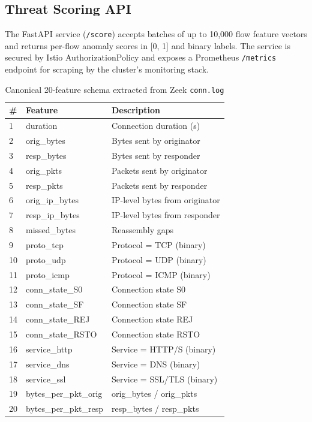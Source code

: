 \subsection{Threat Scoring API}
The FastAPI service (\texttt{/score}) accepts batches of up to 10,000
flow feature vectors and returns per-flow anomaly scores in [0, 1] and
binary labels.
The service is secured by Istio AuthorizationPolicy and exposes a
Prometheus \texttt{/metrics} endpoint for scraping by the cluster's
monitoring stack.

\begin{table}[htbp]
  \centering
  \caption{Canonical 20-feature schema extracted from Zeek \texttt{conn.log}}
  \label{tab:features}
  \begin{tabular}{lll}
    \toprule
    \# & Feature & Description \\
    \midrule
    1  & duration          & Connection duration (s) \\
    2  & orig\_bytes        & Bytes sent by originator \\
    3  & resp\_bytes        & Bytes sent by responder \\
    4  & orig\_pkts         & Packets sent by originator \\
    5  & resp\_pkts         & Packets sent by responder \\
    6  & orig\_ip\_bytes     & IP-level bytes from originator \\
    7  & resp\_ip\_bytes     & IP-level bytes from responder \\
    8  & missed\_bytes      & Reassembly gaps \\
    9  & proto\_tcp         & Protocol = TCP (binary) \\
    10 & proto\_udp         & Protocol = UDP (binary) \\
    11 & proto\_icmp        & Protocol = ICMP (binary) \\
    12 & conn\_state\_S0    & Connection state S0 \\
    13 & conn\_state\_SF    & Connection state SF \\
    14 & conn\_state\_REJ   & Connection state REJ \\
    15 & conn\_state\_RSTO  & Connection state RSTO \\
    16 & service\_http      & Service = HTTP/S (binary) \\
    17 & service\_dns       & Service = DNS (binary) \\
    18 & service\_ssl       & Service = SSL/TLS (binary) \\
    19 & bytes\_per\_pkt\_orig & orig\_bytes / orig\_pkts \\
    20 & bytes\_per\_pkt\_resp & resp\_bytes / resp\_pkts \\
    \bottomrule
  \end{tabular}
\end{table}
